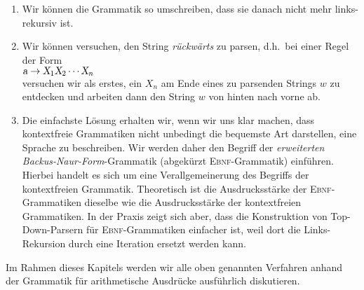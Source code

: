 \begin{enumerate}
\item Wir k\"onnen die Grammatik so umschreiben, dass sie danach nicht mehr links-rekursiv
      ist.
\item Wir k\"onnen versuchen, den String \emph{r\"uckw\"arts} zu parsen, d.h.~bei einer
      Regel der Form
      \\[0.2cm]
      \hspace*{1.3cm}
      $\textsl{a} \rightarrow \textsl{X}_1 \textsl{X}_2 \cdots \textsl{X}_n$
      \\[0.2cm]
      versuchen wir als erstes, ein $X_n$ am Ende eines zu parsenden Strings $w$ zu
      entdecken und arbeiten dann den String $w$ von hinten  nach vorne ab.  
\item Die einfachste L\"osung erhalten wir, wenn wir uns klar machen, dass kontextfreie
      Grammatiken nicht unbedingt die bequemste Art darstellen, eine Sprache 
      zu beschreiben.  Wir werden daher den Begriff der \emph{erweiterten Backus-Naur-Form}-Grammatik
      (abgek\"urzt \textsc{Ebnf}-Grammatik) einf\"uhren.  Hierbei handelt es sich um eine Verallgemeinerung des
      Begriffs der kontextfreien Grammatik.  Theoretisch ist die Ausdrucksst\"arke der
      \textsc{Ebnf}-Grammatiken dieselbe wie die Ausdrucksst\"arke der kontextfreien Grammatiken.
      In der Praxis zeigt sich aber, dass die Konstruktion von Top-Down-Parsern f\"ur
      \textsc{Ebnf}-Grammatiken einfacher ist, weil dort die Links-Rekursion durch eine Iteration ersetzt
      werden kann.
\end{enumerate}
Im Rahmen dieses Kapitels werden wir alle oben genannten Verfahren anhand der Grammatik f\"ur
arithmetische Ausdr\"ucke ausf\"uhrlich diskutieren.  

